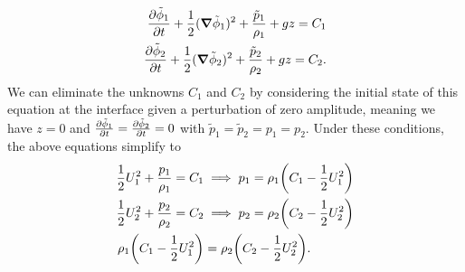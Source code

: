 \documentclass[10pt]{article}
\begin{document}
\begin{align}
    \pdv{\tilde\phi_1}{t} + \frac{1}{2}(\grad\tilde\phi_1)^2 + \frac{\tilde p_1}{\rho_1} + gz = C_1 \label{eq:ber1} \\
    \pdv{\tilde\phi_2}{t} + \frac{1}{2}(\grad\tilde\phi_2)^2 + \frac{\tilde p_2}{\rho_2} + gz = C_2 \label{eq:ber2}.
\end{align}
We can eliminate the unknowns $C_1$ and $C_2$ by considering the initial state of this equation at the interface given a perturbation of zero amplitude, meaning we have $z = 0$ and $\pdv{\tilde\phi_1}{t} = \pdv{\tilde\phi_2}{t} = 0$ with $\tilde p_1 = \tilde p_2 = p_1 = p_2$. Under these conditions, the above equations simplify to
\begin{align}
    \frac{1}{2}U_1^2 + \frac{p_1}{\rho_1} = C_1 & \implies p_1 = \rho_1\qty(C_1 - \frac{1}{2}U_1^2) \label{eq:cc1} \\
    \frac{1}{2}U_2^2 + \frac{p_2}{\rho_2} = C_2 & \implies p_2 = \rho_2\qty(C_2 - \frac{1}{2}U_2^2) \label{eq:cc2} \\
    \rho_1\qty(C_1 - \frac{1}{2}U_1^2) & = \rho_2\qty(C_2 - \frac{1}{2}U_2^2) \label{eq:cc}.
\end{align}
\end{document}
